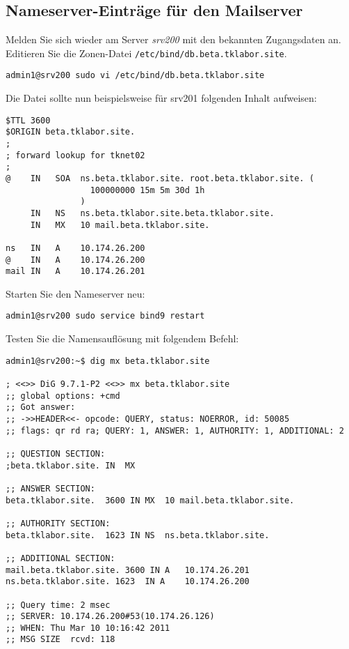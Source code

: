 \subsection{Nameserver-Einträge für den Mailserver}
Melden Sie 
sich wieder am Server \textit{srv200} mit den bekannten Zugangsdaten an.
Editieren Sie die Zonen-Datei \texttt{/etc/bind/db.beta.tklabor.site}.
\begin{lstlisting}
admin1@srv200 sudo vi /etc/bind/db.beta.tklabor.site
\end{lstlisting}
Die Datei sollte nun beispielsweise für srv201 folgenden Inhalt aufweisen:
\begin{scriptsize}
\begin{lstlisting}
$TTL 3600
$ORIGIN beta.tklabor.site.
;
; forward lookup for tknet02
;
@    IN   SOA  ns.beta.tklabor.site. root.beta.tklabor.site. ( 
                 100000000 15m 5m 30d 1h 
               )
     IN   NS   ns.beta.tklabor.site.beta.tklabor.site.
     IN   MX   10 mail.beta.tklabor.site.

ns   IN   A    10.174.26.200
@    IN   A    10.174.26.200
mail IN   A    10.174.26.201
\end{lstlisting}
\end{scriptsize}
Starten Sie den Nameserver neu:
\begin{lstlisting}
admin1@srv200 sudo service bind9 restart
\end{lstlisting}
Testen Sie die Namensauflösung mit folgendem Befehl:
\begin{scriptsize}
\begin{lstlisting}
admin1@srv200:~$ dig mx beta.tklabor.site

; <<>> DiG 9.7.1-P2 <<>> mx beta.tklabor.site
;; global options: +cmd
;; Got answer:
;; ->>HEADER<<- opcode: QUERY, status: NOERROR, id: 50085
;; flags: qr rd ra; QUERY: 1, ANSWER: 1, AUTHORITY: 1, ADDITIONAL: 2

;; QUESTION SECTION:
;beta.tklabor.site.	IN	MX

;; ANSWER SECTION:
beta.tklabor.site.	3600 IN	MX	10 mail.beta.tklabor.site.

;; AUTHORITY SECTION:
beta.tklabor.site.	1623 IN	NS	ns.beta.tklabor.site.

;; ADDITIONAL SECTION:
mail.beta.tklabor.site. 3600 IN A	10.174.26.201
ns.beta.tklabor.site. 1623	IN A	10.174.26.200

;; Query time: 2 msec
;; SERVER: 10.174.26.200#53(10.174.26.126)
;; WHEN: Thu Mar 10 10:16:42 2011
;; MSG SIZE  rcvd: 118
\end{lstlisting}
\end{scriptsize}

